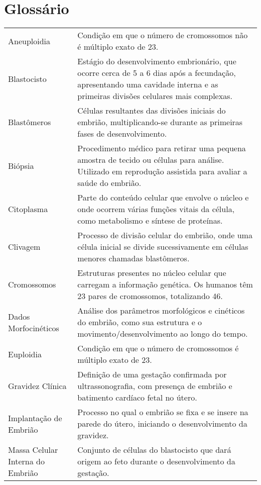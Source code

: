 \chapter*{Glossário}

\begin{flushleft}

\begin{tabularx}{\textwidth}{p{4.5cm} X} %
    Aneuploidia & Condição em que o número de cromossomos não é múltiplo exato de 23. \\
    Blastocisto & Estágio do desenvolvimento embrionário, que ocorre cerca de 5 a 6 dias após a fecundação, apresentando uma cavidade interna e as primeiras divisões celulares mais complexas. \\
    Blastômeros & Células resultantes das divisões iniciais do embrião, multiplicando-se durante as primeiras fases de desenvolvimento. \\
    Biópsia & Procedimento médico para retirar uma pequena amostra de tecido ou células para análise. Utilizado em reprodução assistida para avaliar a saúde do embrião. \\
    Citoplasma & Parte do conteúdo celular que envolve o núcleo e onde ocorrem várias funções vitais da célula, como metabolismo e síntese de proteínas. \\
    Clivagem & Processo de divisão celular do embrião, onde uma célula inicial se divide sucessivamente em células menores chamadas blastômeros. \\
    Cromossomos & Estruturas presentes no núcleo celular que carregam a informação genética. Os humanos têm 23 pares de cromossomos, totalizando 46. \\
    Dados Morfocinéticos & Análise dos parâmetros morfológicos e cinéticos do embrião, como sua estrutura e o movimento/desenvolvimento ao longo do tempo. \\
    Euploidia & Condição em que o número de cromossomos é múltiplo exato de 23. \\
    Gravidez Clínica & Definição de uma gestação confirmada por ultrassonografia, com presença de embrião e batimento cardíaco fetal no útero. \\
    Implantação de Embrião & Processo no qual o embrião se fixa e se insere na parede do útero, iniciando o desenvolvimento da gravidez. \\
    Massa Celular Interna do Embrião & Conjunto de células do blastocisto que dará origem ao feto durante o desenvolvimento da gestação. \\
\end{tabularx}


\end{flushleft}
